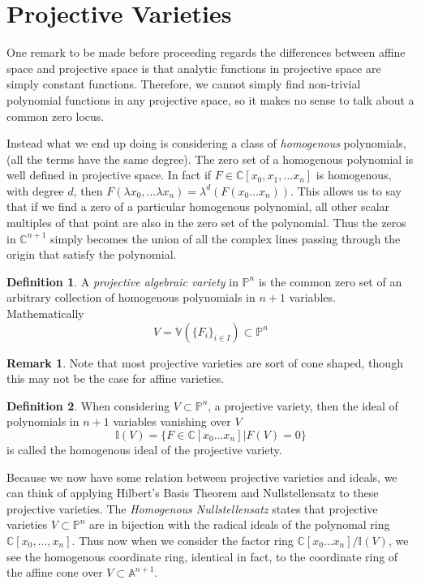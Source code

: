 \documentclass[12pt]{book}
\theoremstyle{definition}
\newtheorem*{definition}{Definition}
\newtheorem*{remark}{Remark}
\begin{document}
\section{Projective Varieties}
One remark to be made before proceeding regards the differences between affine space and projective space is that analytic functions in projective space are simply constant functions. Therefore, we cannot simply find non-trivial polynomial functions in any projective space, so it makes no sense to talk about a common zero locus.

Instead what we end up doing is considering a class of \textit{homogenous} polynomials, (all the terms have the same degree). The zero set of a homogenous polynomial is well defined in projective space. In fact if $F \in \mathbb{C}[x_0, x_1, \ldots x_n]$ is homogenous, with degree $d$, then $F(\lambda x_0, \ldots \lambda x_n) = \lambda^d(F(x_0 \ldots x_n))$. This allows us to say that if we find a zero of a particular homogenous polynomial, all other scalar multiples of that point are also in the zero set of the polynomial. Thus the zeros in $\mathbb{C}^{n+1}$ simply becomes the union of all the complex lines passing through the origin that satisfy the polynomial.

\begin{definition}
    A \textit{projective algebraic variety} in $\mathbb{P}^n$ is the common zero set of an arbitrary collection of homogenous polynomials in $n+1$ variables. Mathematically $$V = \mathbb{V}(\{F_i\}_{i \in I}) \subset \mathbb{P}^n$$
\end{definition}
\begin{remark}
    Note that most projective varieties are sort of cone shaped, though this may not be the case for affine varieties.
\end{remark}
\begin{definition}
    When considering $V \subset \mathbb{P}^n$, a projective variety, then the ideal of polynomials in $n+1$ variables vanishing over $V$ $$\mathbb{I}(V) = \{F \in \mathbb{C}[x_0 \ldots x_n] | F(V) = 0\}$$ is called the homogenous ideal of the projective variety.
\end{definition}
Because we now have some relation between projective varieties and ideals, we can think of applying Hilbert's Basis Theorem and Nullstellensatz to these projective varieties. 
The \textit{Homogenous Nullstellensatz} states that projective varieties $V \subset \mathbb{P}^n$ are in bijection with the radical ideals of the polynomal ring $\mathbb{C}[x_0, \ldots , x_n]$. Thus now when we consider the factor ring $\mathbb{C}[x_0 \ldots x_n]/\mathbb{I}(V)$, we see the homogenous coordinate ring, identical in fact, to the coordinate ring of the affine cone over $V \subset \mathbb{A}^{n+1}$.
\end{document}
